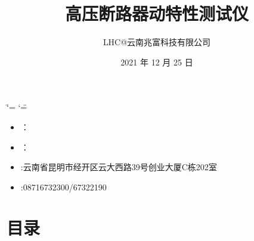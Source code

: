 \documentclass[a4paper,10pt,english]{sphinxmanual}
\title{高压断路器动特性测试仪}
\date{2021 年 12 月 25 日}
\author{LHC@云南兆富科技有限公司}
\begin{document}
\ifdefined\shorthandoff
  \ifnum\catcode`\=\string=\active\shorthandoff{=}\fi
  \ifnum\catcode`\"=\active{}\fi
\fi

\pagestyle{empty}
\sphinxmaketitle
\pagestyle{plain}
\sphinxtableofcontents
\pagestyle{normal}
\label{\detokenize{index::doc}}


\begin{figure}[htbp]
\centering

\noindent{}
\end{figure}
\begin{itemize}
\item {} 
\sphinxAtStartPar
{}：

\item {} 
\sphinxAtStartPar
{}：

\item {} 
\sphinxAtStartPar
{}:云南省昆明市经开区云大西路39号创业大厦C栋202室

\item {} 
\sphinxAtStartPar
{}:0871\sphinxhyphen{}6732300/67322190

\end{itemize}


\chapter{目录}
\label{\detokenize{index:id2}}
\end{document}

